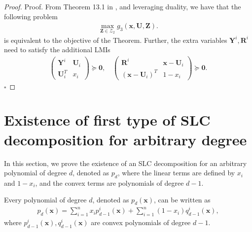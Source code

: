 \documentclass[opre,nonblindrev]{informs3} %
\begin{document}
\begin{appendices}
\begin{proof}{Proof. }
From Theorem 13.1 in \cite{bertsimas22}, and leveraging duality, we have that the following problem  
\begin{align*}
    \max_{\boldsymbol{Z} \in \mathcal{Z}_2} g_3(\boldsymbol{x},\boldsymbol{U},\boldsymbol{Z}).
\end{align*}  
is equivalent to the objective of the Theorem.
Further, the extra variables $\boldsymbol{Y}^i, \boldsymbol{R}^i$ need to satisfy the additional LMIs 
\begin{align*}
    \begin{pmatrix}
                \boldsymbol{Y}^i & \boldsymbol{U}_i \\
                \boldsymbol{U}_i^T & x_i
           \end{pmatrix} \succeq \boldsymbol{0}, \quad  \begin{pmatrix}
                \boldsymbol{R}^i & \boldsymbol{x}-\boldsymbol{U}_i \\
                \left(\boldsymbol{x}-\boldsymbol{U}_i\right)^T & 1-x_i
           \end{pmatrix} \succeq \boldsymbol{0}.
\end{align*} \hfill $\square$
\end{proof} 


\section{Existence of first type of SLC decomposition for arbitrary degree}
In this section, we prove the existence of an SLC decomposition for an arbitrary polynomial of degree $d$, denoted as $p_d$, where the linear terms are defined by $x_i$ and $1-x_i$, and the convex terms are polynomials of degree $d-1$. 
\begin{theorem} 
\label{thm:arb_degree_first}
Every polynomial of degree $d$, denoted as $p_d(\boldsymbol{x})$, can be written as 
\begin{align*}
    p_d(\boldsymbol{x}) = \sum_{i=1}^n x_i p_{d-1}^i(\boldsymbol{x}) + \sum_{i=1}^n \left(1 - x_i \right) q_{d-1}^i(\boldsymbol{x}),
\end{align*}  
where $p_{d-1}^i(\boldsymbol{x}), q_{d-1}^i(\boldsymbol{x})$ are convex polynomials of degree $d-1$. 
\end{theorem} 


\end{appendices}
\end{document}
